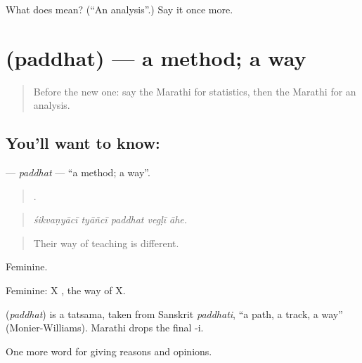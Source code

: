 \begin{tcolorbox}[breakable,colback=teal!4,colframe=teal!35!black,title={Before you move on}]
What does  mean? (\textquotedblleft{}An analysis\textquotedblright{}.) Say it once more.
\end{tcolorbox}
\section[\texorpdfstring{\mr{पद्धत} (paddhat)}{पद्धत (paddhat)}]{ (paddhat) — a method; a way}

\label{lesson:MR-C373-paddhat}



\begin{quote}
Before the new one: say the Marathi for statistics, then the Marathi for an analysis.
\end{quote}

\subsection*{You'll want to know: }
\textbf{} — \emph{paddhat} — \textquotedblleft{}a method; a way\textquotedblright{}.

\begin{quote}
    .
\end{quote}

\begin{quote}
\emph{śikvaṇyācī tyāñcī paddhat vegḷī āhe.}
\end{quote}

\begin{quote}
Their way of teaching is different.
\end{quote}

Feminine.

Feminine: X  , the way of X.

\begin{cousinweb}
\textbf{} (\emph{paddhat}) is a tatsama, taken from Sanskrit \emph{paddhati}, \textquotedblleft{}a path, a track, a way\textquotedblright{} (Monier-Williams). Marathi drops the final -i.
\end{cousinweb}

\begin{grammarlens}[title={What you've built}]
One more word for giving reasons and opinions.
\end{grammarlens}

